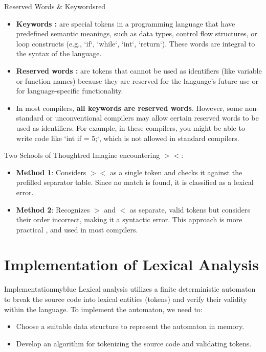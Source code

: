 \vspace{0.5cm}



\begin{prettyBox}{Reserved Words \& Keywords}{red}
\begin{itemize}
\item \textbf{Keywords :} are special tokens in a programming language that have predefined semantic meanings, such as data types, control flow structures, or loop constructs (e.g., `if`, `while`, `int`, `return`). These words are integral to the syntax of the language.
\item \textbf{Reserved words :} are tokens that cannot be used as identifiers (like variable or function names) because they are reserved for the language's future use or for language-specific functionality.
\item In most compilers, \textbf{all keywords are reserved words}. However, some non-standard or unconventional compilers may allow certain reserved words to be used as identifiers. For example, in these compilers, you might be able to write code like `int if = 5;`, which is not allowed in standard compilers.
\end{itemize}
\end{prettyBox}

\newpage
\null


\begin{prettyBox}{Two Schools of Thought}{red}
Imagine encountering \(><\):  
\begin{itemize}
    \item \textbf{Method 1}: Considers \(><\) as a single token and checks it against the prefilled separator table. Since no match is found, it is classified as a lexical error.  
    \item \textbf{Method 2}: Recognizes \(>\) and \(<\) as separate, valid tokens but considers their order incorrect, making it a syntactic error. This approach is more practical , and used
        in most compilers.  
\end{itemize}
\end{prettyBox}

\vspace{0.5cm}
\section{Implementation of Lexical Analysis}  
\begin{prettyBox}{Implementation}{myblue}  
Lexical analysis utilizes a finite deterministic automaton to break the source code into  
lexical entities (tokens) and verify their validity within the language.  
To implement the automaton, we need to:  
\begin{itemize}  
    \item Choose a suitable data structure to represent the automaton in memory.  
    \item Develop an algorithm for tokenizing the source code and validating tokens.  
\end{itemize}  
\end{prettyBox}  

